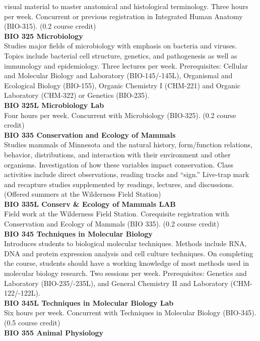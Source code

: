 \documentclass[
  letterpaper,
]{scrbook}
\begin{document}
visual material to master anatomical and histological terminology. Three
hours per week. Concurrent or previous registration in Integrated Human
Anatomy (BIO-315). (0.2 course credit)\\
\textbf{BIO 325 Microbiology}\\
Studies major fields of microbiology with emphasis on bacteria and
viruses. Topics include bacterial cell structure, genetics, and
pathogenesis as well as immunology and epidemiology. Three lectures per
week. Prerequisites: Cellular and Molecular Biology and Laboratory
(BIO-145/-145L), Organismal and Ecological Biology (BIO-155), Organic
Chemistry I (CHM-221) and Organic Laboratory (CHM-322) or Genetics
(BIO-235).\\
\textbf{BIO 325L Microbiology Lab}\\
Four hours per week. Concurrent with Microbiology (BIO-325). (0.2 course
credit)\\
\textbf{BIO 335 Conservation and Ecology of Mammals}\\
Studies mammals of Minnesota and the natural history, form/function
relations, behavior, distributions, and interaction with their
environment and other organisms. Investigation of how these variables
impact conservation. Class activities include direct observations,
reading tracks and ``sign.'' Live-trap mark and recapture studies
supplemented by readings, lectures, and discussions. (Offered summers at
the Wilderness Field Station)\\
\textbf{BIO 335L Conserv \& Ecology of Mammals LAB}\\
Field work at the Wilderness Field Station. Corequisite registration
with Conservation and Ecology of Mammals (BIO 335). (0.2 course
credit)\\
\textbf{BIO 345 Techniques in Molecular Biology}\\
Introduces students to biological molecular techniques. Methods include
RNA, DNA and protein expression analysis and cell culture techniques. On
completing the course, students should have a working knowledge of most
methods used in molecular biology research. Two sessions per week.
Prerequisites: Genetics and Laboratory (BIO-235/-235L), and General
Chemistry II and Laboratory (CHM-122/-122L).\\
\textbf{BIO 345L Techniques in Molecular Biology Lab}\\
Six hours per week. Concurrent with Techniques in Molecular Biology
(BIO-345). (0.5 course credit)\\
\textbf{BIO 355 Animal Physiology}\\
\end{document}
